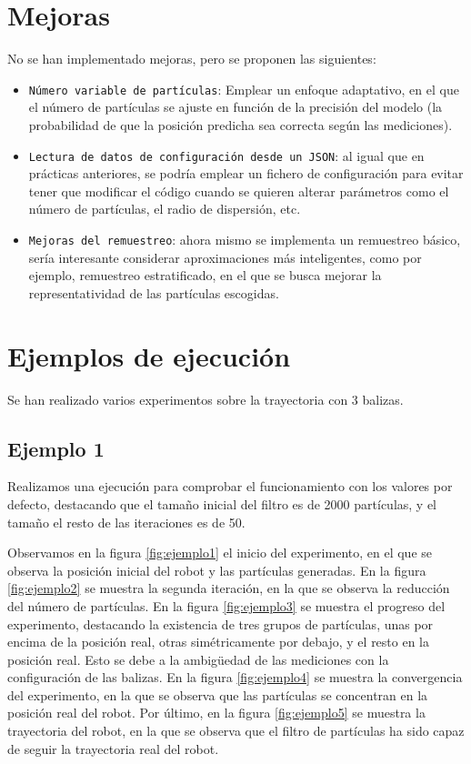 \section{Mejoras}
No se han implementado mejoras, pero se proponen las siguientes:
\begin{itemize}
  \item \texttt{Número variable de partículas}: Emplear un enfoque adaptativo, en el que el número de partículas se ajuste en función
de la precisión del modelo (la probabilidad de que la posición predicha sea correcta según las mediciones).
  \item \texttt{Lectura de datos de configuración desde un JSON}: al igual que en prácticas anteriores, se podría emplear un fichero de configuración para evitar tener
que modificar el código cuando se quieren alterar parámetros como el número de partículas, el radio de dispersión, etc.
  \item \texttt{Mejoras del remuestreo}: ahora mismo se implementa un remuestreo básico, sería interesante considerar aproximaciones más inteligentes, como 
por ejemplo, remuestreo estratificado, en el que se busca mejorar la representatividad de las partículas escogidas.
\end{itemize}

\section{Ejemplos de ejecución}
Se han realizado varios experimentos sobre la trayectoria con 3 balizas.
\subsection{Ejemplo 1}

Realizamos una ejecución para comprobar el funcionamiento con los valores por defecto, destacando que el tamaño inicial del filtro es de 2000 partículas, y el tamaño el resto de las iteraciones es de 50.

Observamos en la figura \ref{fig:ejemplo1} el inicio del experimento, en el que se observa la posición inicial del robot y las partículas generadas. En la figura \ref{fig:ejemplo2} se muestra la segunda iteración, en la que se observa la reducción del número de partículas.
En la figura \ref{fig:ejemplo3} se muestra el progreso del experimento, destacando la existencia de tres grupos de partículas, unas por encima de la posición real, otras simétricamente por debajo, y el resto en la posición real. Esto se debe a la ambigüedad de las mediciones con la configuración de las balizas.
En la figura \ref{fig:ejemplo4} se muestra la convergencia del experimento, en la que se observa que las partículas se concentran en la posición real del robot. Por último, en la figura \ref{fig:ejemplo5} se muestra la trayectoria del robot, en la que se observa que el filtro de partículas ha sido capaz de seguir la trayectoria real del robot.

